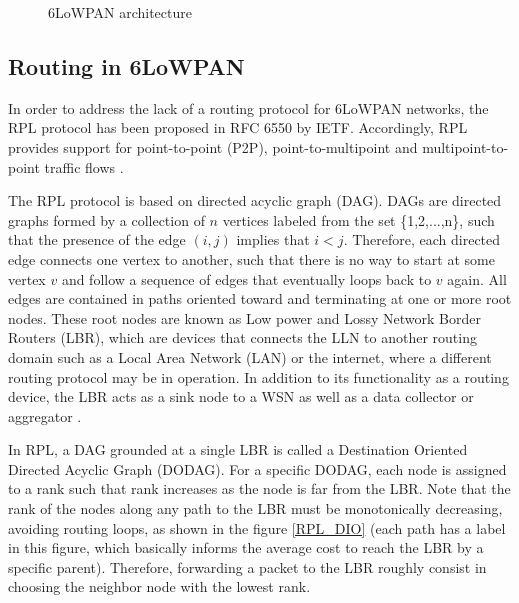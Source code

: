 \documentclass[final,authoryear,3p,twocolumn]{elsarticle}
\begin{document}
\begin{figure}
\centering
{}
\caption{6LoWPAN architecture}
\label{stack_6lowpan}
\end{figure}

\subsection{Routing in 6LoWPAN}
In order to address the lack of a routing protocol for 6LoWPAN networks, the RPL protocol has been proposed in RFC 6550 by IETF. Accordingly, RPL provides support for point-to-point (P2P), point-to-multipoint and multipoint-to-point traffic flows \citep{RFC6550}.

The RPL protocol is based on directed acyclic graph (DAG). DAGs are directed graphs formed by a collection of $n$ vertices labeled from the set \{1,2,...,n\}, such that the presence of the edge $(i,j)$ implies that $i < j$. Therefore, each directed edge connects one vertex to another, such that there is no way to start at some vertex $v$ and follow a sequence of edges that eventually loops back to $v$ again. All edges are contained in paths oriented toward and terminating at one or more root nodes. These root nodes are known as Low power and Lossy Network Border Routers (LBR), which are devices that connects the LLN to another routing domain such as a Local Area Network (LAN) or the internet, where a different routing protocol may be in operation. In addition to its functionality as a routing device, the LBR acts as a sink node to a WSN as well as a data collector or aggregator \citep{RFC7102}.

In RPL, a DAG grounded at a single LBR is called a Destination Oriented Directed Acyclic Graph (DODAG). For a specific DODAG, each node is assigned to a rank such that rank increases as the node is far from the LBR. Note that the rank of the nodes along any path to the LBR must be monotonically decreasing, avoiding routing loops, as shown in the figure \ref{RPL_DIO} (each path has a label in this figure, which basically informs the average cost to reach the LBR by a specific parent). Therefore, forwarding a packet to the LBR roughly consist in choosing the neighbor node with the lowest rank.
\end{document}
